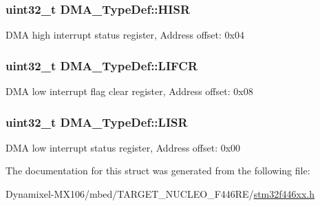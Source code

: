 \subsubsection[{\texorpdfstring{H\+I\+SR}{HISR}}]{ uint32\+\_\+t D\+M\+A\+\_\+\+Type\+Def\+::\+H\+I\+SR}\hypertarget{struct_d_m_a___type_def_a01a90a5fcd6459e10b81c0ab737dd2e3}{}\label{struct_d_m_a___type_def_a01a90a5fcd6459e10b81c0ab737dd2e3}
D\+MA high interrupt status register, Address offset\+: 0x04 
\subsubsection[{\texorpdfstring{L\+I\+F\+CR}{LIFCR}}]{ uint32\+\_\+t D\+M\+A\+\_\+\+Type\+Def\+::\+L\+I\+F\+CR}\hypertarget{struct_d_m_a___type_def_a11adb689c874d38b49fa44990323b653}{}\label{struct_d_m_a___type_def_a11adb689c874d38b49fa44990323b653}
D\+MA low interrupt flag clear register, Address offset\+: 0x08 
\subsubsection[{\texorpdfstring{L\+I\+SR}{LISR}}]{ uint32\+\_\+t D\+M\+A\+\_\+\+Type\+Def\+::\+L\+I\+SR}\hypertarget{struct_d_m_a___type_def_aacb4a0977d281bc809cb5974e178bc2b}{}\label{struct_d_m_a___type_def_aacb4a0977d281bc809cb5974e178bc2b}
D\+MA low interrupt status register, Address offset\+: 0x00 

The documentation for this struct was generated from the following file\+:\begin{DoxyCompactItemize}
\item 
Dynamixel-\/\+M\+X106/mbed/\+T\+A\+R\+G\+E\+T\+\_\+\+N\+U\+C\+L\+E\+O\+\_\+\+F446\+R\+E/\hyperlink{stm32f446xx_8h}{stm32f446xx.\+h}\end{DoxyCompactItemize}

